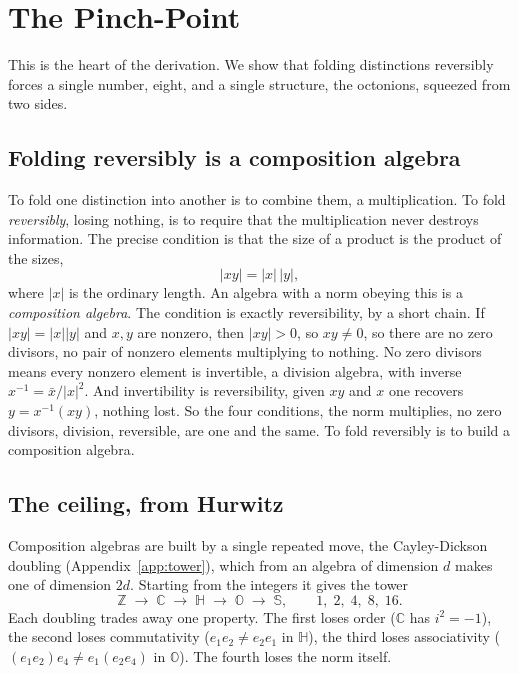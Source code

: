 \section{The Pinch-Point} \label{sec:pinch}

This is the heart of the derivation. We show that folding distinctions reversibly forces a single number, eight, and
a single structure, the octonions, squeezed from two sides.

\subsection{Folding reversibly is a composition algebra}

To fold one distinction into another is to combine them, a multiplication. To fold \emph{reversibly}, losing nothing,
is to require that the multiplication never destroys information. The precise condition is that the size of a product
is the product of the sizes,
\begin{equation}
  |xy| = |x|\,|y|,
\end{equation}
where $|x|$ is the ordinary length. An algebra with a norm obeying this is a \emph{composition algebra}. The condition
is exactly reversibility, by a short chain. If $|xy| = |x||y|$ and $x, y$ are nonzero, then $|xy| > 0$, so
$xy \neq 0$, so there are no zero divisors, no pair of nonzero elements multiplying to nothing. No zero divisors means
every nonzero element is invertible, a division algebra, with inverse $x^{-1} = \bar{x}/|x|^2$. And invertibility is
reversibility, given $xy$ and $x$ one recovers $y = x^{-1}(xy)$, nothing lost. So the four conditions, the norm
multiplies, no zero divisors, division, reversible, are one and the same. To fold reversibly is to build a composition
algebra.

\subsection{The ceiling, from Hurwitz}

Composition algebras are built by a single repeated move, the Cayley-Dickson doubling (Appendix~\ref{app:tower}),
which from an algebra of dimension $d$ makes one of dimension $2d$. Starting from the integers it gives the tower
\begin{equation}
  \mathbb{Z} \;\to\; \mathbb{C} \;\to\; \mathbb{H} \;\to\; \mathbb{O} \;\to\; \mathbb{S}, \qquad
  1,\;2,\;4,\;8,\;16.
\end{equation}
Each doubling trades away one property. The first loses order ($\mathbb{C}$ has $i^2 = -1$), the second loses
commutativity ($e_1 e_2 \neq e_2 e_1$ in $\mathbb{H}$), the third loses associativity ($(e_1 e_2) e_4 \neq e_1 (e_2 e_4)$
in $\mathbb{O}$). The fourth loses the norm itself.

